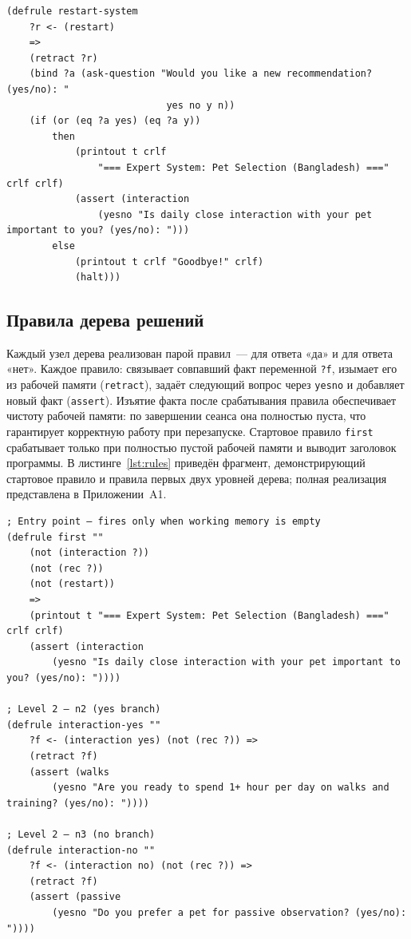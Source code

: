\documentclass[a4paper,final]{article}
\begin{document}
\begin{lstlisting}[language=CLIPS,
	caption={Правило restart-system},
	label=lst:restart]
(defrule restart-system
    ?r <- (restart)
    =>
    (retract ?r)
    (bind ?a (ask-question "Would you like a new recommendation? (yes/no): "
                            yes no y n))
    (if (or (eq ?a yes) (eq ?a y))
        then
            (printout t crlf
                "=== Expert System: Pet Selection (Bangladesh) ===" crlf crlf)
            (assert (interaction
                (yesno "Is daily close interaction with your pet important to you? (yes/no): ")))
        else
            (printout t crlf "Goodbye!" crlf)
            (halt)))
\end{lstlisting}

\subsection{Правила дерева решений}

Каждый узел дерева реализован парой правил~--- для ответа «да» и для ответа «нет». Каждое правило: связывает совпавший факт переменной \texttt{?f}, изымает его из рабочей памяти (\texttt{retract}), задаёт следующий вопрос через \texttt{yesno} и добавляет новый факт (\texttt{assert}). Изъятие факта после срабатывания правила обеспечивает чистоту рабочей памяти: по завершении сеанса она полностью пуста, что гарантирует корректную работу при перезапуске. Стартовое правило \texttt{first} срабатывает только при полностью пустой рабочей памяти и выводит заголовок программы. В листинге~\ref{lst:rules} приведён фрагмент, демонстрирующий стартовое правило и правила первых двух уровней дерева; полная реализация представлена в Приложении~A1.

\begin{lstlisting}[language=CLIPS,
	caption={Фрагмент правил дерева решений (стартовое правило и первые два уровня)},
	label=lst:rules]
; Entry point — fires only when working memory is empty
(defrule first ""
    (not (interaction ?))
    (not (rec ?))
    (not (restart))
    =>
    (printout t "=== Expert System: Pet Selection (Bangladesh) ===" crlf crlf)
    (assert (interaction
        (yesno "Is daily close interaction with your pet important to you? (yes/no): "))))

; Level 2 — n2 (yes branch)
(defrule interaction-yes ""
    ?f <- (interaction yes) (not (rec ?)) =>
    (retract ?f)
    (assert (walks
        (yesno "Are you ready to spend 1+ hour per day on walks and training? (yes/no): "))))

; Level 2 — n3 (no branch)
(defrule interaction-no ""
    ?f <- (interaction no) (not (rec ?)) =>
    (retract ?f)
    (assert (passive
        (yesno "Do you prefer a pet for passive observation? (yes/no): "))))
\end{lstlisting}
\end{document}
